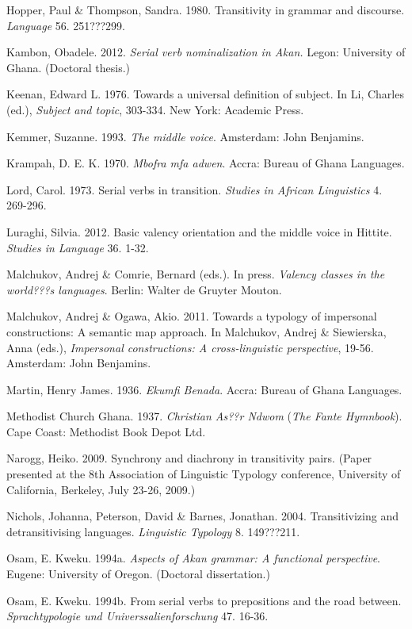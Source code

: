 \documentclass[output=paper]{langsci/langscibook}
\begin{document}
Hopper, Paul \& Thompson, Sandra. 1980. Transitivity in grammar and discourse. \textit{Language} 56. 251???299.

Kambon, Obadele. 2012. \textit{Serial verb nominalization in Akan.} Legon: University of Ghana. (Doctoral thesis.)

Keenan, Edward L. 1976. Towards a universal definition of subject. In Li, Charles (ed.), \textit{Subject and topic}, 303-334. New York: Academic Press.

Kemmer, Suzanne. 1993. \textit{The middle voice}. Amsterdam: John Benjamins.

Krampah, D. E. K. 1970. \emph{Mbofra mfa adwen}. Accra: Bureau of Ghana Languages.

Lord, Carol. 1973. Serial verbs in transition. \textit{Studies in African Linguistics} 4. 269-296.

Luraghi, Silvia. 2012. Basic valency orientation and the middle voice in Hittite. \textit{Studies in Language} 36. 1-32.

Malchukov, Andrej \& Comrie, Bernard (eds.). In press. \textit{Valency classes in the world???s languages}. Berlin: Walter de Gruyter Mouton.

Malchukov, Andrej \& Ogawa, Akio. 2011. Towards a typology of impersonal constructions: A semantic map approach. In Malchukov, Andrej \& Siewierska, Anna (eds.), \textit{Impersonal constructions: A cross-linguistic perspective}, 19-56. Amsterdam: John Benjamins.

Martin, Henry James. 1936. \emph{Ekumfi Benada}. Accra: Bureau of Ghana Languages.

Methodist Church Ghana. 1937. \textit{Christian As??r Ndwom }(\textit{The Fante Hymnbook}). Cape Coast: Methodist Book Depot Ltd.

Narogg, Heiko. 2009. Synchrony and diachrony in transitivity pairs. (Paper presented at the 8th Association of Linguistic Typology conference, University of California, Berkeley, July 23-26, 2009.)

Nichols, Johanna, Peterson, David \& Barnes, Jonathan. 2004. Transitivizing and detransitivising languages. \textit{Linguistic Typology} 8. 149???211.

Osam, E. Kweku. 1994a. \textit{Aspects of Akan grammar: A functional perspective}. Eugene: University of Oregon. (Doctoral dissertation.)

Osam, E. Kweku. 1994b. From serial verbs to prepositions and the road between. \textit{Sprachtypologie und Universsalienforschung} 47. 16-36.
\end{document}
